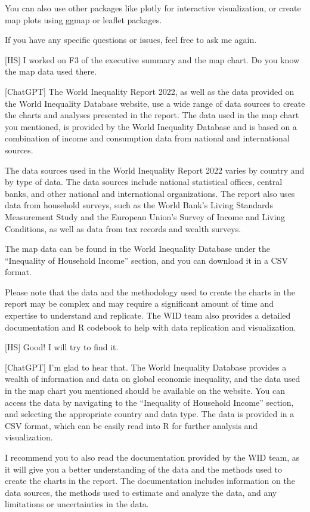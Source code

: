 \documentclass[
]{bxjsbook}
\theoremstyle{definition}
\theoremstyle{definition}
\theoremstyle{definition}
\theoremstyle{definition}
\theoremstyle{remark}
\begin{document}
You can also use other packages like plotly for interactive visualization, or create map plots using ggmap or leaflet packages.

If you have any specific questions or issues, feel free to ask me again.

{[}HS{]} I worked on F3 of the executive summary and the map chart. Do you know the map data used there.

{[}ChatGPT{]} The World Inequality Report 2022, as well as the data provided on the World Inequality Database website, use a wide range of data sources to create the charts and analyses presented in the report. The data used in the map chart you mentioned, is provided by the World Inequality Database and is based on a combination of income and consumption data from national and international sources.

The data sources used in the World Inequality Report 2022 varies by country and by type of data. The data sources include national statistical offices, central banks, and other national and international organizations. The report also uses data from household surveys, such as the World Bank's Living Standards Measurement Study and the European Union's Survey of Income and Living Conditions, as well as data from tax records and wealth surveys.

The map data can be found in the World Inequality Database under the ``Inequality of Household Income'' section, and you can download it in a CSV format.

Please note that the data and the methodology used to create the charts in the report may be complex and may require a significant amount of time and expertise to understand and replicate. The WID team also provides a detailed documentation and R codebook to help with data replication and visualization.

{[}HS{]} Good! I will try to find it.

{[}ChatGPT{]} I'm glad to hear that. The World Inequality Database provides a wealth of information and data on global economic inequality, and the data used in the map chart you mentioned should be available on the website. You can access the data by navigating to the ``Inequality of Household Income'' section, and selecting the appropriate country and data type. The data is provided in a CSV format, which can be easily read into R for further analysis and visualization.

I recommend you to also read the documentation provided by the WID team, as it will give you a better understanding of the data and the methods used to create the charts in the report. The documentation includes information on the data sources, the methods used to estimate and analyze the data, and any limitations or uncertainties in the data.
\end{document}
